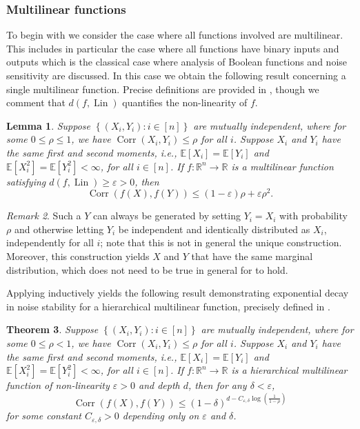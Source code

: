 \documentclass[12pt,letterpaper]{amsart}
\def\E{\mathbb{E}}
\def\R{\mathbb{R}}
\def\Corr{\operatorname{Corr}}
\def\Lin{\operatorname{Lin}}
\newcommand{\set}[1]{\left\{#1\right\}}
\newcommand{\paren}[1]{\left(#1\right)}
\newcommand{\1}[1]{1_{\left\{#1\right\}}}
\newtheorem{theorem}{Theorem}[section]
\newtheorem{lemma}[theorem]{Lemma}
\theoremstyle{definition}
\theoremstyle{remark}
\newtheorem{remark}[theorem]{Remark}
\begin{document}
\subsubsection{Multilinear functions}
To begin with we consider the case where all functions involved are multilinear.
This includes in particular the case where all functions have binary inputs and outputs which is the classical case where analysis of Boolean functions and noise sensitivity are discussed.
In this case we obtain the following result concerning a single multilinear function.
Precise definitions are provided in , though we comment that $d(f,\Lin)$ quantifies the non-linearity of $f$.
\begin{lemma}\label{lemma:multilinear}
    Suppose $\set{(X_i,Y_i):i\in[n]}$ are mutually independent, where for some $0\leq\rho\leq1$, we have $\Corr(X_i,Y_i)\leq\rho$ for all $i$.
    Suppose $X_i$ and $Y_i$ have the same first and second moments, i.e., $\E[X_i]=\E[Y_i]$ and $\E[X_i^2]=\E[Y_i^2]<\infty$, for all $i\in[n]$.
    If $f:\R^n\to\R$ is a multilinear function satisfying $d(f,\Lin)\geq\varepsilon>0$, then 
    \begin{equation}\label{eq:lemma_multilinear}
        \Corr(f(X),f(Y))\leq(1-\varepsilon)\rho+\varepsilon\rho^2.
    \end{equation}
\end{lemma}
\begin{remark}\label{remark:correlation_construction}
    Such a $Y$ can always be generated by setting $Y_i=X_i$ with probability $\rho$ and otherwise letting $Y_i$ be independent and identically distributed as $X_i$, independently for all $i$; note that this is not in general the unique construction.
    Moreover, this construction yields $X$ and $Y$ that have the same marginal distribution, which does not need to be true in general for  to hold.
\end{remark}
Applying  inductively yields the following result demonstrating exponential decay in noise stability for a hierarchical multilinear function, precisely defined in .
\begin{theorem}\label{theorem:multilinear}
    Suppose $\set{(X_i,Y_i):i\in[n]}$ are mutually independent, where for some $0\leq\rho<1$, we have $\Corr(X_i,Y_i)\leq\rho$ for all $i$.
    Suppose $X_i$ and $Y_i$ have the same first and second moments, i.e., $\E[X_i]=\E[Y_i]$ and $\E[X_i^2]=\E[Y_i^2]<\infty$, for all $i\in[n]$.
    If $f:\R^n\to\R$ is a hierarchical multilinear function of non-linearity $\varepsilon>0$ and depth $d$, then for any $\delta<\varepsilon$,
    \[ \Corr(f(X),f(Y)) \leq \paren{1-\delta}^{d-C_{\varepsilon,\delta}\log\paren{\frac{1}{1-\rho}}} \]
    for some constant $C_{\varepsilon,\delta}>0$ depending only on $\varepsilon$ and $\delta$.
\end{theorem}
\end{document}
